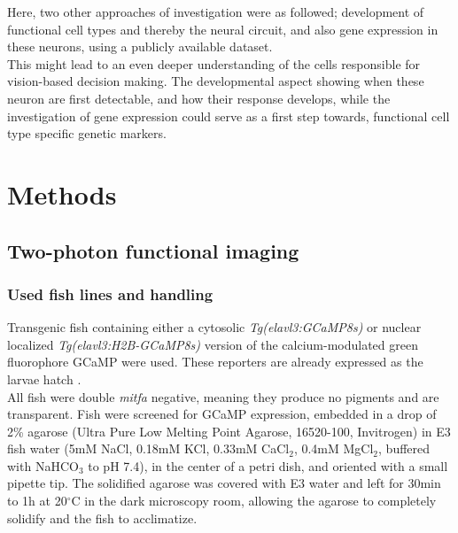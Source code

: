 \documentclass[12pt, a4paper, oneside]{article}
\begin{document}
Here, two other approaches of investigation were as followed; development of functional cell types and thereby the neural circuit, and also gene expression in these neurons, using a publicly available dataset.\\
This might lead to an even deeper understanding of the cells responsible for vision-based decision making. The developmental aspect showing when these neuron are first detectable, and how their response develops, while the investigation of gene expression could serve as a first step towards, functional cell type specific genetic markers.\\

\clearpage
\section{Methods}

\subsection{Two-photon functional imaging}

\subsubsection{Used fish lines and handling}
\label{sec:fishlines}
Transgenic fish containing either a cytosolic \textit{Tg(elavl3:GCaMP8s)} \parencite{zhangFastSensitiveGCaMP2023} or nuclear localized  \textit{Tg(elavl3:H2B-GCaMP8s)} version of the calcium-modulated green fluorophore GCaMP were used. These reporters are already expressed as the larvae hatch \parencite{kimProlongedBrainwideExpression2014}.\\
All fish were double \textit{mitfa} negative, meaning they produce no pigments and are transparent. Fish were screened for GCaMP expression, embedded in a drop of 2\% agarose  (Ultra Pure Low Melting Point Agarose, 16520-100, Invitrogen) in E3 fish water (5mM NaCl, 0.18mM KCl, 0.33mM CaCl$_2$, 0.4mM MgCl$_2$, buffered with NaHCO$_3$ to pH 7.4), in the center of a petri dish, and oriented with a small pipette tip. The solidified agarose was covered with E3 water and left for 30min to 1h at 20$^\circ$C in the dark microscopy room, allowing the agarose to completely solidify and the fish to acclimatize.\\
\end{document}
